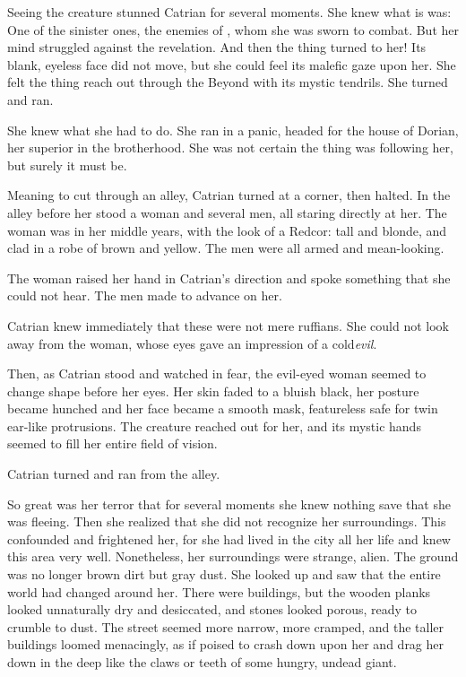 \begin{garbage}
Seeing the creature stunned Catrian for several moments. She knew what is was: One of the sinister ones, the enemies of \Miith{}, whom she was sworn to combat. But her mind struggled against the revelation. And then the thing turned to her! Its blank, eyeless face did not move, but she could feel its malefic gaze upon her. She felt the thing reach out through the Beyond with its mystic tendrils. She turned and ran. 

She knew what she had to do. 
She ran in a panic, headed for the house of \Mister{} Dorian, her superior in the brotherhood. She was not certain the thing was following her, but surely it must be. 

Meaning to cut through an alley, Catrian turned at a corner, then halted. In the alley before her stood a woman and several men, all staring directly at her. 
The woman was in her middle years, with the look of a Redcor: tall and blonde, and clad in a robe of brown and yellow. 
The men were all armed and mean-looking. 

The woman raised her hand in Catrian's direction and spoke something that she could not hear. The men made to advance on her.

Catrian knew immediately that these were not mere ruffians. 
She could not look away from the woman, whose eyes gave an impression of a cold\prikker \emph{evil}. 

Then, as Catrian stood and watched in fear, the evil-eyed woman seemed to change shape before her eyes. 
Her skin faded to a bluish black, her posture became hunched and her face became a smooth mask, featureless safe for twin ear-like protrusions. 
The creature reached out for her, and its mystic hands seemed to fill her entire field of vision. 

Catrian turned and ran from the alley. 

So great was her terror that for several moments she knew nothing save that she was fleeing. Then she realized that she did not recognize her surroundings. This confounded and frightened her, for she had lived in the city all her life and knew this area very well.
Nonetheless, her surroundings were strange, alien. The ground was no longer brown dirt but gray dust. She looked up and saw that the entire world had changed around her. There were buildings, but the wooden planks looked unnaturally dry and desiccated, and stones looked porous, ready to crumble to dust. The street seemed more narrow, more cramped, and the taller buildings loomed menacingly, as if poised to crash down upon her and drag her down in the deep like the claws or teeth of some hungry, undead giant. 


\end{garbage}
